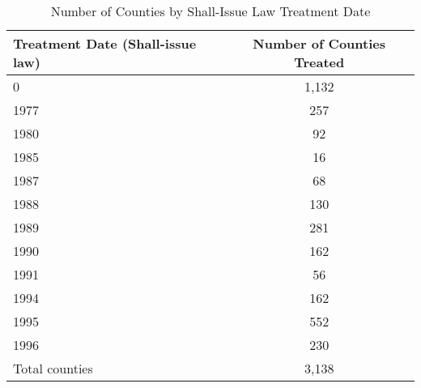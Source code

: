 \begin{table}[htbp]\centering
\caption{Number of Counties by Shall-Issue Law Treatment Date}\label{tab:countybycohort}
\begin{tabular}{lc}
\toprule
\textbf{Treatment Date (Shall-issue law)} & \textbf{Number of Counties Treated} \\
\midrule
0           &       1,132\\
1977        &         257\\
1980        &          92\\
1985        &          16\\
1987        &          68\\
1988        &         130\\
1989        &         281\\
1990        &         162\\
1991        &          56\\
1994        &         162\\
1995        &         552\\
1996        &         230\\
\midrule
Total counties &     3,138 \\
\bottomrule
\end{tabular}
\end{table}
